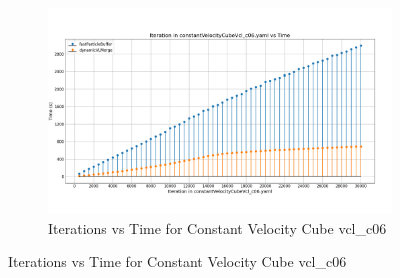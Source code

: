 \begin{figure}[H]\ContinuedFloat
\centering
\begin{subfigure}{\linewidth}
    \centering
    \includegraphics[width=\linewidth]{graphs/constantVelocityCube/normalExperiments/iter/vclc06.png}
    \caption{Iterations vs Time for Constant Velocity Cube vcl\_c06}
    \label{fig:constantVelocityCube}
\end{subfigure}
\end{figure}








